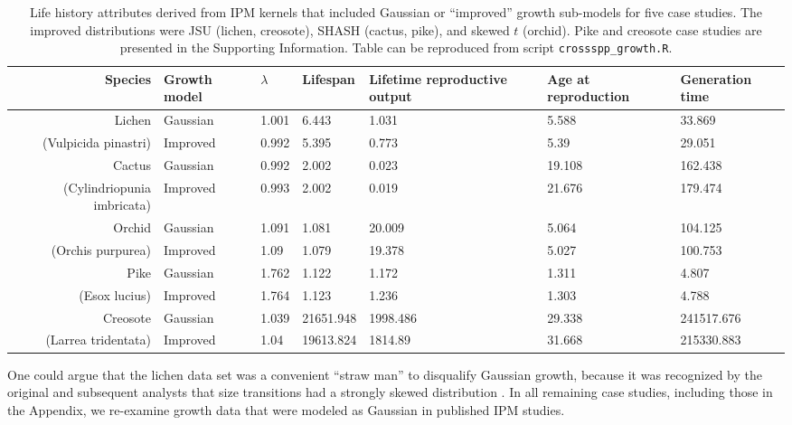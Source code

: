 \documentclass[12pt]{article}
\begin{document}
\begin{table}[tbp]
	\centering
	\begingroup\fontsize{9pt}{10pt}\selectfont
	\begin{tabular}{rp{1.5cm}|p{1.5cm}p{1.5cm}p{1.5cm}p{1.5cm}p{1.5cm}}
		{\textbf{Species}} & {\textbf{Growth model}} & {\textbf{$\lambda$}} & {\textbf{Lifespan}} & {\textbf{Lifetime reproductive output}} & {\textbf{Age at reproduction}} & {\textbf{Generation time}} \\ 
		\hline
		Lichen & Gaussian & 1.001 & 6.443 & 1.031 & 5.588 & 33.869 \\ 
		(Vulpicida pinastri) & Improved & 0.992 & 5.395 & 0.773 & 5.39 & 29.051 \\ 
		\hline
		Cactus & Gaussian & 0.992 & 2.002 & 0.023 & 19.108 & 162.438 \\ 
		(Cylindriopunia imbricata) & Improved & 0.993 & 2.002 & 0.019 & 21.676 & 179.474 \\ 
		\hline
		Orchid & Gaussian & 1.091 & 1.081 & 20.009 & 5.064 & 104.125 \\ 
		(Orchis purpurea) & Improved & 1.09 & 1.079 & 19.378 & 5.027 & 100.753 \\ 
		\hline
		Pike & Gaussian & 1.762 & 1.122 & 1.172 & 1.311 & 4.807 \\ 
		(Esox lucius) & Improved & 1.764 & 1.123 & 1.236 & 1.303 & 4.788 \\ 
		\hline
		Creosote & Gaussian & 1.039 & 21651.948 & 1998.486 & 29.338 & 241517.676 \\ 
		(Larrea tridentata) & Improved & 1.04 & 19613.824 & 1814.89 & 31.668 & 215330.883 \\ 
	\end{tabular}
	\endgroup
	\caption{Life history attributes derived from IPM kernels that included Gaussian or ``improved'' growth sub-models for five case studies. The improved distributions were JSU (lichen, creosote), SHASH (cactus, pike), and skewed $t$ (orchid). Pike and creosote case studies are presented in the Supporting Information. Table can be reproduced from script \texttt{crossspp\_growth.R}.}
	\label{tab:crossspp}
\end{table}

One could argue that the lichen data set was a convenient ``straw man'' to disqualify Gaussian growth, because it was recognized by the original and subsequent analysts that size transitions had a strongly skewed distribution \citep{shriver2012comparative,peterson2019improving}. 
In all remaining case studies, including those in the Appendix, we re-examine growth data that were modeled as Gaussian in published IPM studies. 
\end{document}
